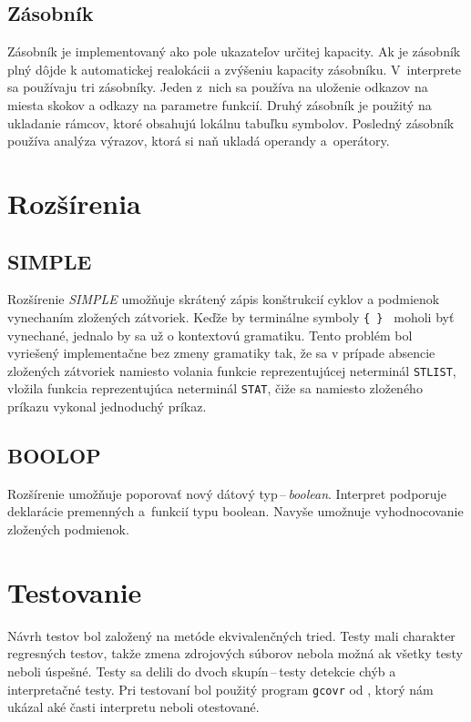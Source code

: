 \documentclass[11pt,a4paper]{article}
\begin{document}
	\subsection{Zásobník}
	Zásobník je implementovaný ako pole ukazateľov určitej kapacity. Ak je zásobník
	plný dôjde k automatickej realokácii a zvýšeniu kapacity zásobníku.
	V~interprete sa používaju tri zásobníky. Jeden z~nich sa používa na uloženie
	odkazov na miesta skokov a odkazy na parametre funkcií. Druhý zásobník je
	použitý na ukladanie rámcov, ktoré obsahujú lokálnu tabuľku symbolov.
	Posledný zásobník používa analýza výrazov, ktorá si naň ukladá operandy a~operátory.

	\section{Rozšírenia}
	\label{rozsirenia}

	\subsection{SIMPLE}
	Rozšírenie \emph{SIMPLE} umožňuje skrátený zápis konštrukcií cyklov a
	podmienok vynechaním zložených zátvoriek. Keďže by terminálne symboly
	\texttt{\{ \} } moholi byť vynechané, jednalo by sa už o kontextovú gramatiku.
	Tento problém bol vyriešený implementačne bez zmeny
	gramatiky tak, že sa v prípade absencie zložených zátvoriek namiesto volania
	funkcie reprezentujúcej neterminál \texttt{STLIST}, vložila
	funkcia reprezentujúca neterminál \texttt{STAT}, čiže sa namiesto zloženého
	príkazu vykonal jednoduchý príkaz.

	\subsection{BOOLOP}
	Rozšírenie umožňuje poporovať nový dátový typ\,--\,\emph{boolean}. Interpret
	podporuje deklarácie premenných a~funkcií typu boolean. Navyše
	umožnuje vyhodnocovanie zložených podmienok.

	\section{Testovanie}
	\label{testovanie}
	Návrh testov bol založený na metóde ekvivalenčných tried. Testy mali charakter
	regresných testov, takže zmena zdrojových súborov nebola možná ak
	všetky testy neboli úspešné. Testy sa delili do dvoch skupín\,--\,testy
	detekcie chýb a interpretačné testy. Pri testovaní bol použitý program
	\texttt{gcovr} od \cite{COV}, ktorý nám ukázal aké časti interpretu neboli otestované.
	\newpage
\end{document}
